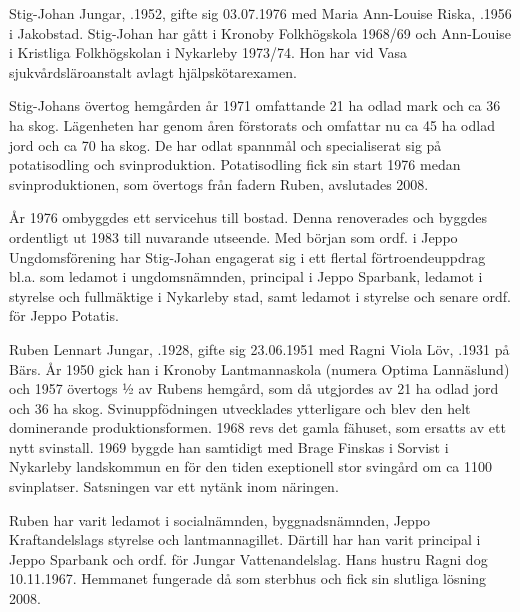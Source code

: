 


Stig-Johan Jungar, .1952, gifte sig 03.07.1976 med Maria Ann-Louise Riska, .1956 i Jakobstad. Stig-Johan har gått i Kronoby Folkhögskola 1968/69 och Ann-Louise i Kristliga Folkhögskolan i Nykarleby 1973/74. Hon har vid Vasa sjukvårdsläroanstalt avlagt hjälpskötarexamen.

Stig-Johans övertog hemgården år 1971 omfattande 21 ha odlad mark och ca 36 ha skog. Lägenheten har genom åren förstorats och omfattar nu ca 45 ha odlad jord och ca 70 ha skog. De har odlat spannmål och specialiserat sig på potatisodling och svinproduktion.  Potatisodling fick sin start 1976 medan svinproduktionen, som övertogs från fadern Ruben, avslutades 2008.

År 1976 ombyggdes ett servicehus till bostad. Denna renoverades och byggdes ordentligt ut 1983 till nuvarande utseende. Med början som ordf. i Jeppo Ungdomsförening har Stig-Johan engagerat sig i ett flertal förtroendeuppdrag bl.a. som ledamot i ungdomsnämnden, principal i Jeppo Sparbank, ledamot i styrelse och fullmäktige i Nykarleby stad, samt ledamot i styrelse och senare ordf. för Jeppo Potatis.





Ruben Lennart Jungar, .1928, gifte sig 23.06.1951 med Ragni Viola Löv, .1931 på Bärs. År 1950 gick han i Kronoby Lantmannaskola (numera Optima Lannäslund) och 1957 övertogs ½ av Rubens hemgård, som då utgjordes av 21 ha odlad jord och 36 ha skog. Svinuppfödningen utvecklades ytterligare och blev den helt dominerande produktionsformen. 1968 revs det gamla fähuset, som ersatts av ett nytt svinstall. 1969 byggde han samtidigt med Brage Finskas i Sorvist i Nykarleby landskommun en för den tiden exeptionell stor svingård om ca 1100 svinplatser. Satsningen var ett nytänk inom näringen.

Ruben har varit ledamot i socialnämnden, byggnadsnämnden, Jeppo Kraftandelslags styrelse och lantmannagillet. Därtill har han varit principal i Jeppo Sparbank och ordf. för Jungar Vattenandelslag. Hans hustru Ragni dog 10.11.1967. Hemmanet fungerade då som sterbhus och fick sin slutliga lösning 2008.

